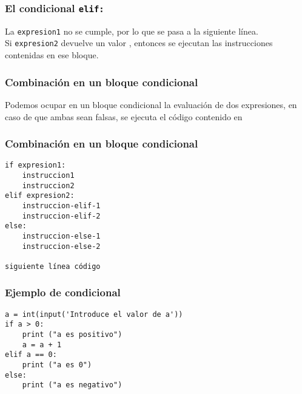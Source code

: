 \documentclass[12pt]{beamer}
\begin{document}
\begin{frame}
\begin{frame}
\frametitle{El condicional \texttt{elif:}}
La \texttt{expresion1} no se cumple, por lo que se pasa a la siguiente línea.
\\
\bigskip
\pause
Si \texttt{expresion2} devuelve un valor , entonces se ejecutan las instrucciones contenidas en ese bloque.
\end{frame}
\begin{frame}[fragile]
\frametitle{Combinación en un bloque condicional}
Podemos ocupar en un bloque condicional la evaluación de dos expresiones, en caso de que ambas sean falsas, se ejecuta el código contenido en 
\end{frame}
\begin{frame}[fragile]
\frametitle{Combinación en un bloque condicional}
\fontsize{13}{13}\selectfont
\begin{verbatim}
if expresion1:
    instruccion1
    instruccion2
elif expresion2:
    instruccion-elif-1
    instruccion-elif-2
else:
    instruccion-else-1
    instruccion-else-2

siguiente línea código
\end{verbatim}
\end{frame}
\begin{frame}[fragile]
\frametitle{Ejemplo de condicional}
\begin{lstlisting}
a = int(input('Introduce el valor de a'))
if a > 0:
    print ("a es positivo")
    a = a + 1
elif a == 0: 
    print ("a es 0")
else:
    print ("a es negativo")
\end{lstlisting}
\end{frame}



\end{frame}
\end{document}
